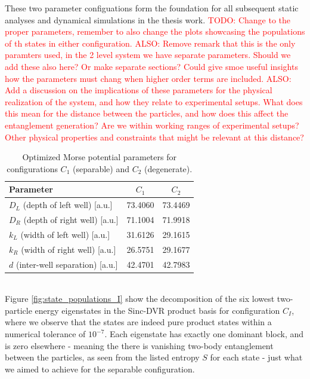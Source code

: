 \documentclass{subfiles}
\begin{document}
These two parameter configuations form the foundation for all subsequent static analyses and dynamical simulations in the thesis work. \textcolor{red}{TODO: Change to the proper parameters, remember to also change the plots showcasing the populations of th states in either configuration. ALSO: Remove remark that this is the only paramters used, in the 2 level system we have separate parameters. Should we add these also here? Or make separate sections? Could give smoe useful insights how the parameters must chang when higher order terms are included. ALSO: Add a discussion on the implications of these parameters for the physical realization of the system, and how they relate to experimental setups. What does this mean for the distance between the particles, and how does this affect the entanglement generation? Are we within working ranges of experimental setups? Other physical properties and constraints that might be relevant at this distance?}
\begin{table}[h!]
  \centering
  \caption{Optimized Morse potential parameters for configurations \(C_1\) (separable) and \(C_2\) (degenerate).}
  \label{tab:optimized_params}
  \begin{tabular}{lcc}
    \toprule
    Parameter & \(C_1\) & \(C_2\) \\
    \midrule
    \(D_L\) (depth of left well)       [a.u.] & 73.4060 & 73.4469 \\
    \(D_R\) (depth of right well)      [a.u.] & 71.1004 & 71.9918 \\
    \(k_L\) (width of left well)       [a.u.] & 31.6126 & 29.1615 \\
    \(k_R\) (width of right well)      [a.u.] & 26.5751 & 29.1677 \\
    \(d\)   (inter-well separation)     [a.u.] & 42.4701 & 42.7983 \\
    \bottomrule
  \end{tabular}
\end{table}
\\
Figure \ref{fig:state_populations_I} show the decomposition of the six lowest two-particle energy eigenstates in the Sinc-DVR product basis for configuration $C_I$, where we observe that the states are indeed pure product states within a numerical tolerance of $10^{-7}$. Each eigenstate has exactly one dominant block, and is zero elsewhere - meaning the there is vanishing two-body entanglement between the particles, as seen from the listed entropy $S$ for each state - just what we aimed to achieve for the separable configuration. 
\end{document}
